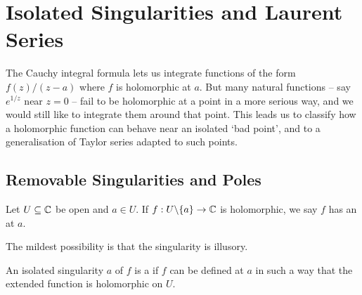 \documentclass[a4paper]{scrartcl}
\begin{document}
\section{Isolated Singularities and Laurent Series}

The Cauchy integral formula lets us integrate functions of the form $f(z)/(z - a)$ where $f$ is holomorphic at $a$. But many natural functions -- say $e^{1/z}$ near $z = 0$ -- fail to be holomorphic at a point in a more serious way, and we would still like to integrate them around that point. This leads us to classify how a holomorphic function can behave near an isolated `bad point', and to a generalisation of Taylor series adapted to such points.

\subsection{Removable Singularities and Poles}

\begin{definition}
    Let $U \subseteq \mathbb{C}$ be open and $a \in U$. If $f: U \backslash \{a\} \rightarrow \mathbb{C}$ is holomorphic, we say $f$ has an  at $a$.
\end{definition}

The mildest possibility is that the singularity is illusory.

\begin{definition}
    An isolated singularity $a$ of $f$ is a  if $f$ can be defined at $a$ in such a way that the extended function is holomorphic on $U$.
\end{definition}
\end{document}
